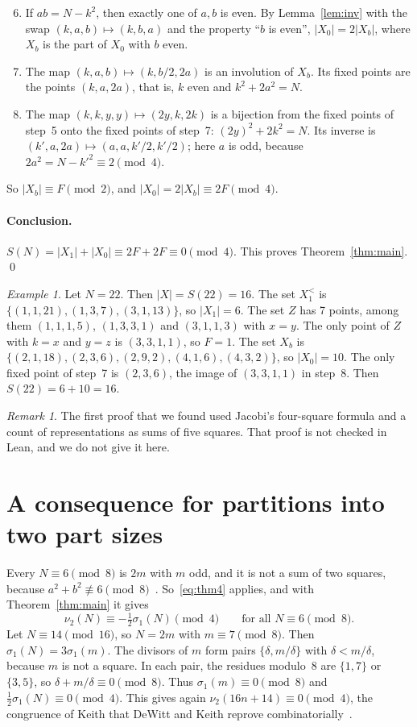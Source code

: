 \documentclass[11pt]{article}
\theoremstyle{remark}
\newtheorem{remark}[theorem]{Remark}
\newtheorem{example}[theorem]{Example}
\begin{document}
\begin{enumerate}\setcounter{enumi}{5}
\item If $ab=N-k^2$, then exactly one of $a,b$ is even. By Lemma~\ref{lem:inv} with the swap $(k,a,b)\mapsto(k,b,a)$ and the property ``$b$ is even'', $|X_0|=2|X_b|$, where $X_b$ is the part of $X_0$ with $b$ even.
\item The map $(k,a,b)\mapsto(k,b/2,2a)$ is an involution of $X_b$. Its fixed points are the points $(k,a,2a)$, that is, $k$ even and $k^2+2a^2=N$.
\item The map $(k,k,y,y)\mapsto(2y,k,2k)$ is a bijection from the fixed points of step~5 onto the fixed points of step~7: $(2y)^2+2k^2=N$. Its inverse is $(k',a,2a)\mapsto(a,a,k'/2,k'/2)$; here $a$ is odd, because $2a^2=N-k'^2\equiv 2\pmod 4$.
\end{enumerate}
So $|X_b|\equiv F\pmod 2$, and $|X_0|=2|X_b|\equiv 2F\pmod 4$.

\paragraph{Conclusion.} $S(N)=|X_1|+|X_0|\equiv 2F+2F\equiv 0\pmod 4$. This proves Theorem~\ref{thm:main}. \qed

\begin{example}
Let $N=22$. Then $|X|=S(22)=16$. The set $X_1^<$ is $\{(1,1,21),(1,3,7),(3,1,13)\}$, so $|X_1|=6$. The set $Z$ has 7 points, among them $(1,1,1,5)$, $(1,3,3,1)$ and $(3,1,1,3)$ with $x=y$. The only point of $Z$ with $k=x$ and $y=z$ is $(3,3,1,1)$, so $F=1$. The set $X_b$ is $\{(2,1,18),(2,3,6),(2,9,2),(4,1,6),(4,3,2)\}$, so $|X_0|=10$. The only fixed point of step~7 is $(2,3,6)$, the image of $(3,3,1,1)$ in step~8. Then $S(22)=6+10=16$.
\end{example}

\begin{remark}
The first proof that we found used Jacobi's four-square formula and a count of representations as sums of five squares. That proof is not checked in Lean, and we do not give it here.
\end{remark}

\section{A consequence for partitions into two part sizes}

Every $N\equiv 6\pmod 8$ is $2m$ with $m$ odd, and it is not a sum of two squares, because $a^2+b^2\not\equiv 6\pmod 8$~\cite[Section~5]{JKKMS}. So~\eqref{eq:thm4} applies, and with Theorem~\ref{thm:main} it gives
\[
\nu_2(N)\equiv-\tfrac12\sigma_1(N)\pmod 4\qquad\text{for all } N\equiv 6\pmod 8.
\]
Let $N\equiv 14\pmod{16}$, so $N=2m$ with $m\equiv 7\pmod 8$. Then $\sigma_1(N)=3\sigma_1(m)$. The divisors of $m$ form pairs $\{\delta,m/\delta\}$ with $\delta<m/\delta$, because $m$ is not a square. In each pair, the residues modulo~8 are $\{1,7\}$ or $\{3,5\}$, so $\delta+m/\delta\equiv 0\pmod 8$. Thus $\sigma_1(m)\equiv 0\pmod 8$ and $\frac12\sigma_1(N)\equiv 0\pmod 4$. This gives again $\nu_2(16n+14)\equiv 0\pmod 4$, the congruence of Keith that DeWitt and Keith reprove combinatorially~\cite{DK}.
\end{document}
